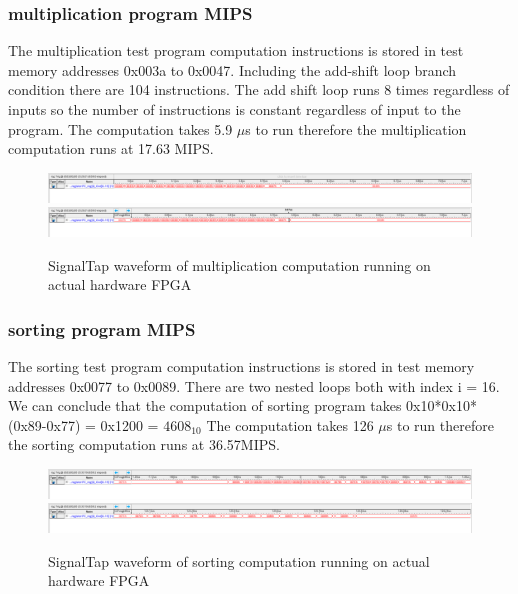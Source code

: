 \documentclass[a4paper,12pt]{report}
\begin{document}
\subsubsection{multiplication program MIPS}
The multiplication test program computation instructions is stored in test memory addresses 0x003a to 0x0047. Including the add-shift loop branch condition there are 104 instructions. The add shift loop runs 8 times regardless of inputs so the number of instructions is constant regardless of input to the program. \newline
The computation takes 5.9 $\mu$s to run therefore the multiplication computation runs at 17.63 MIPS.
\begin{figure}[H]
    \begin{center}
        \includegraphics[scale=.3]{mul_computation0}
        \includegraphics[scale=.3]{mul_computation1}
        \caption{SignalTap waveform of multiplication computation running on actual hardware FPGA }   
    \end{center}
\end{figure}
\subsubsection{sorting program MIPS}
The sorting test program computation instructions is stored in test memory addresses 0x0077 to 0x0089. There are two nested loops both with index i = 16. We can conclude that the computation of sorting program takes 0x10*0x10*(0x89-0x77) = 0x1200 = $4608_{10}$ \newline
The computation takes 126 $\mu$s  to run therefore the sorting computation runs at 36.57MIPS.
\begin{figure}[H]
    \begin{center}
        \includegraphics[scale=.3]{sort_computation0}
        \includegraphics[scale=.3]{sort_computation1}
        \caption{SignalTap waveform of sorting computation running on actual hardware FPGA}   
    \end{center}
\end{figure}
\end{document}
